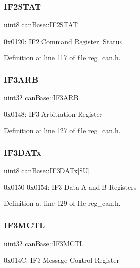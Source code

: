 \subsubsection{\texorpdfstring{I\+F2\+S\+T\+AT}{IF2STAT}}
{\footnotesize\ttfamily uint8 can\+Base\+::\+I\+F2\+S\+T\+AT}

0x0120\+: I\+F2 Command Register, Status 

Definition at line 117 of file reg\+\_\+can.\+h.

\mbox{\label{structcanBase_af68e73a09131a6c79bb080fdcbb47535}} 
\subsubsection{\texorpdfstring{I\+F3\+A\+RB}{IF3ARB}}
{\footnotesize\ttfamily uint32 can\+Base\+::\+I\+F3\+A\+RB}

0x0148\+: I\+F3 Arbitration Register 

Definition at line 127 of file reg\+\_\+can.\+h.

\mbox{\label{structcanBase_a5581e3aff2b321077bb77b3d2eaba5a7}} 
\subsubsection{\texorpdfstring{I\+F3\+D\+A\+Tx}{IF3DATx}}
{\footnotesize\ttfamily uint8 can\+Base\+::\+I\+F3\+D\+A\+Tx\mbox{[}8\+U\mbox{]}}

0x0150-\/0x0154\+: I\+F3 Data A and B Registers 

Definition at line 129 of file reg\+\_\+can.\+h.

\mbox{\label{structcanBase_a1f3901e707899a1070d85cbd9e9e32c8}} 
\subsubsection{\texorpdfstring{I\+F3\+M\+C\+TL}{IF3MCTL}}
{\footnotesize\ttfamily uint32 can\+Base\+::\+I\+F3\+M\+C\+TL}

0x014C\+: I\+F3 Message Control Register 

